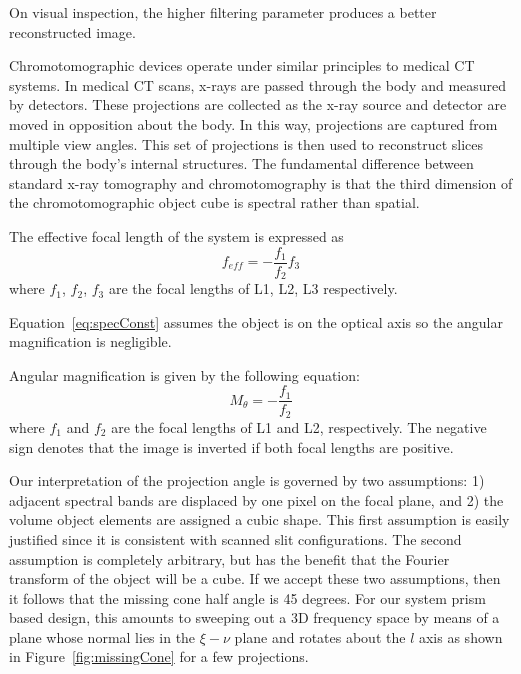 On visual inspection, the higher filtering parameter produces a better reconstructed image. 


Chromotomographic devices operate under similar principles to medical \ac{CT} systems. In medical \ac{CT} scans, x-rays are passed through the body and measured by detectors. These projections are collected as the x-ray source and detector are moved in opposition about the body. In this way, projections are captured from multiple view angles. This set of projections is then used to reconstruct slices through the body's internal structures. The fundamental difference between standard x-ray tomography and chromotomography is that the third dimension of the chromotomographic object cube is spectral rather than spatial.




The effective focal length of the system is expressed as
\begin{equation}
\label{eq:feff}
f_{eff} = -\frac{f_1}{f_2}f_3
\end{equation}
where $f_1$, $f_2$, $f_3$ are the focal lengths of L1, L2, L3 respectively.

Equation~\eqref{eq:specConst} assumes the object is on the optical axis so the angular magnification is negligible.

Angular magnification is given by the following equation:
\begin{equation}
\label{eq:angResolution}
M_{\theta}=-\frac{f_1}{f_2}
\end{equation}
where $f_1$ and $f_2$ are the focal lengths of L1 and L2, respectively. The negative sign denotes that the image is inverted if both focal lengths are positive.


Our interpretation of the projection angle is governed by two assumptions: 1) adjacent spectral bands are displaced by one pixel on the focal plane, and 2) the volume object elements are assigned a cubic shape. This first assumption is easily justified since it is consistent with scanned slit configurations. The second assumption is completely arbitrary, but has the benefit that the Fourier transform of the object will be a cube. If we accept these two assumptions, then it follows that the missing cone half angle is 45 degrees. For our system prism based design, this amounts to sweeping out a 3D frequency space by means of a plane whose normal lies in the $\xi-\nu$ plane and rotates about the $l$ axis as shown in Figure~\ref{fig:missingCone} for a few projections.

